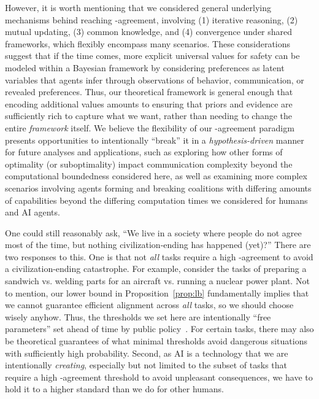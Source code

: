 However, it is worth mentioning that we considered general underlying mechanisms behind reaching \agree-agreement, involving (1) iterative reasoning, (2) mutual updating, (3) common knowledge, and (4) convergence under shared frameworks, which flexibly encompass many scenarios.
These considerations suggest that if the time comes, more explicit universal values for safety can be modeled within a Bayesian framework by considering preferences as latent variables that agents infer through observations of behavior, communication, or revealed preferences. 
Thus, our theoretical framework is general enough that encoding additional values amounts to ensuring that priors and evidence are sufficiently rich to capture what we want, rather than needing to change the entire \emph{framework} itself.
We believe the flexibility of our \agree-agreement paradigm presents opportunities to intentionally ``break'' it in a \emph{hypothesis-driven} manner for future analyses and applications, such as exploring how other forms of optimality (or suboptimality) impact communication complexity beyond the computational boundedness considered here, as well as examining more complex scenarios involving agents forming and breaking coalitions with differing amounts of capabilities beyond the differing computation times we considered for humans and AI agents.

One could still reasonably ask, ``We live in a society where people do not agree most of the time, but nothing civilization-ending has happened (yet)?''
There are two responses to this.
One is that not \emph{all} tasks require a high \agree-agreement to avoid a civilization-ending catastrophe.
For example, consider the tasks of preparing a sandwich vs. welding parts for an aircraft vs. running a nuclear power plant.
Not to mention, our lower bound in Proposition~\ref{prop:lb} fundamentally implies that we cannot guarantee efficient alignment across \emph{all} tasks, so we should choose wisely anyhow.
Thus, the thresholds we set here are intentionally ``free parameters'' set ahead of time by public policy~\citep{bengio2025international}.
For certain tasks, there may also be theoretical guarantees of what minimal thresholds avoid dangerous situations with sufficiently high probability.
Second, as AI is a technology that we are intentionally \emph{creating}, especially but not limited to the subset of tasks that require a high \agree-agreement threshold to avoid unpleasant consequences, we have to hold it to a higher standard than we do for other humans.

